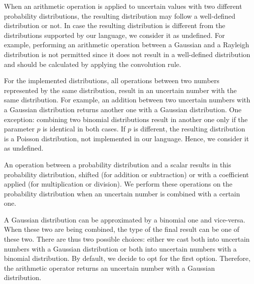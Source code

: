 When an arithmetic operation is applied to uncertain values with two different probability distributions, the resulting distribution may follow a well-defined distribution or not.
In case the resulting distribution is different from the distributions supported by our language, we consider it as undefined. 
For example, performing an arithmetic operation between a Gaussian and a Rayleigh distribution is not permitted since it does not result in a well-defined distribution and should be calculated by applying the convolution rule.

For the implemented distributions, all operations between two numbers represented by the same distribution, result in an uncertain number with the same distribution. 
For example, an addition between two uncertain numbers with a Gaussian distribution returns another one with a Gaussian distribution.
One exception: combining two binomial distributions result in another one only if the parameter $p$ is identical in both cases.
If $p$ is different, the resulting distribution is a Poisson distribution, not implemented in our language.
Hence, we consider it as undefined.

An operation between a probability distribution and a scalar results in this probability distribution, shifted (for addition or subtraction) or with a coefficient applied (for multiplication or division).
We perform these operations on the probability distribution when an uncertain number is combined with a certain one.

A Gaussian distribution can be approximated by a binomial one and vice-versa.
When these two are being combined, the type of the final result can be one of these two.
There are thus two possible choices: either we cast both into uncertain numbers with a Gaussian distribution or both into uncertain numbers with a binomial distribution.
By default, we decide to opt for the first option.
Therefore, the arithmetic operator returns an uncertain number with a Gaussian distribution.







